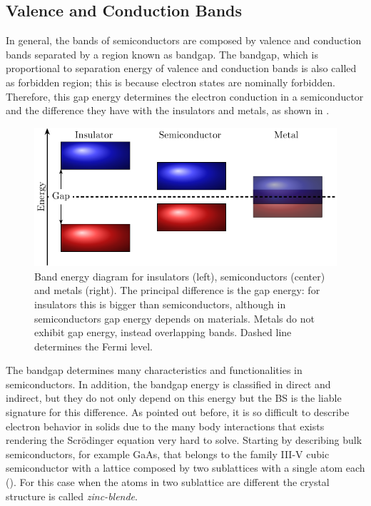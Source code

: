 \subsection{Valence and Conduction Bands}
\label{subsec:chapter-1-valence-and-conduction-bands}
\vspace{-10mm}
In general,  the bands of semiconductors are composed by valence and conduction bands separated by a  region known as bandgap. 
The bandgap, which is proportional to separation energy of valence and conduction bands is also called as forbidden region; this is because electron states are nominally forbidden. Therefore, this gap energy determines the electron conduction in a semiconductor and the difference they have with the insulators and metals, as shown in .  

\begin{figure}[h!]
	\centering
	\includegraphics[width=\linewidth]{../figures/chapter-1/solid-sort/build/solid-sort}
	\caption{
Band energy diagram for insulators (left), semiconductors (center) and metals (right). The principal difference is the gap energy: for insulators this is bigger than semiconductors, although in semiconductors gap energy depends on materials. Metals do not exhibit gap energy, instead overlapping bands. Dashed line determines the Fermi level.
	}
	\label{fig:subsubsection-1.1.1-solid-types}
\end{figure}

The bandgap determines many characteristics and functionalities in semiconductors. In addition, the bandgap energy is classified in direct and indirect, but they do not only depend on this energy but the \gls{BS} is the liable signature for this difference. As pointed out before, it is so difficult to describe electron behavior in solids due to the many body interactions that exists rendering the Scr\"odinger equation very hard to solve. 
Starting by describing bulk semiconductors, for example GaAs, that belongs to the  family III-V cubic semiconductor with a lattice composed by two sublattices with a single atom each (). For this case when the atoms in two sublattice are different the crystal structure is called \emph{zinc-blende}\cite{vurgaftman2020bands}.

